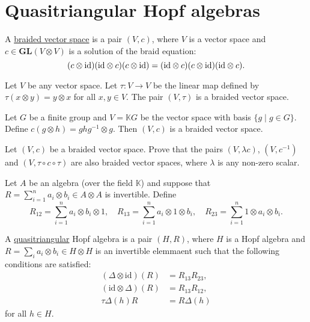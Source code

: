\section{Quasitriangular Hopf algebras}


\begin{definition}
A \underline{braided vector space} is a pair $\left(V,c\right)$, where
$V$ is a vector space and $c\in\mathbf{GL}(V\otimes V)$ is a solution
of the braid equation:
\[
(c\otimes\mathrm{id})(\mathrm{id}\otimes c)(c\otimes\mathrm{id})=(\mathrm{id}\otimes c)(c\otimes\mathrm{id})(\mathrm{id}\otimes c).
\]
\end{definition}

\begin{example}
Let $V$ be any vector space. Let $\tau:V\to V$ be the linear map
defined by $\tau(x\otimes y)=y\otimes x$ for all $x,y\in V$. The
pair $(V,\tau)$ is a braided vector space. 
\end{example}

\begin{example}
Let $G$ be a finite group and $V=\mathbb{K}G$ be the vector space
with basis $\{g\mid g\in G\}$. Define $c(g\otimes h)=ghg^{-1}\otimes g$.
Then $(V,c)$ is a braided vector space.
\end{example}

\begin{exercise}
Let $(V,c)$ be a braided vector space. Prove that the pairs $(V,\lambda c)$,
$(V,c^{-1})$ and $(V,\tau\circ c\circ\tau)$ are also braided vector
spaces, where $\lambda$ is any non-zero scalar.
\end{exercise}


Let $A$ be an algebra (over the field $\mathbb{K}$) and suppose
that $R=\sum_{i=1}^{n}a_{i}\otimes b_{i}\in A\otimes A$ is invertible.
Define 
\[
R_{12}=\sum_{i=1}^{n}a_{i}\otimes b_{i}\otimes1,\quad R_{13}=\sum_{i=1}^{n}a_{i}\otimes1\otimes b_{i},\quad R_{23}=\sum_{i=1}^{n}1\otimes a_{i}\otimes b_{i}.
\]

\begin{definition}
A \underline{quasitriangular} Hopf algebra is a pair $(H,R)$, where
$H$ is a Hopf algebra and $R=\sum_{i}a_{i}\otimes b_{i}\in H\otimes H$
is an invertible elemmaent such that the following conditions are satisfied:
\begin{align}
(\Delta\otimes\textrm{id})(R) & =R_{13}R_{23},\label{QT:2}\\
(\textrm{id}\otimes\Delta)(R) & =R_{13}R_{12},\label{QT:3}\\
\tau\Delta(h)R & =R\Delta(h)\label{QT:1}
\end{align}
for all $h\in H$.
\end{definition}


